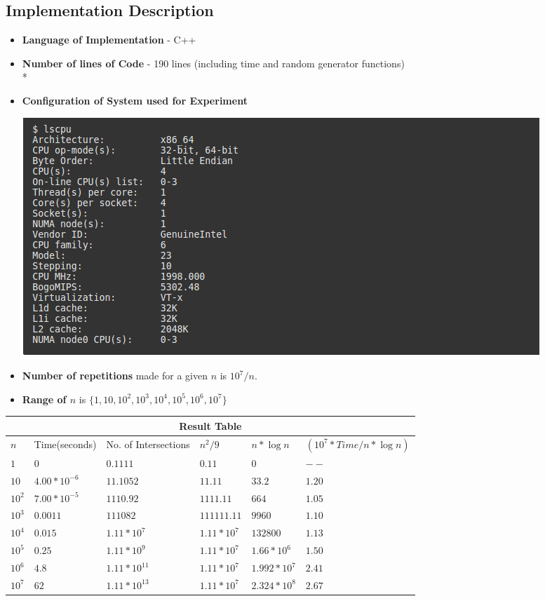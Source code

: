 \documentclass{article}
\begin{document}
\subsection{Implementation Description}
\begin{itemize}
\item {\bf Language of Implementation} - C++ 
\item {\bf Number of lines of Code} - 190 lines (including time and random generator functions)\\*
\item {\bf Configuration of System used for Experiment}
\begin{center}
\includegraphics[scale=0.5]{system_conf.png}
\end{center}
\item {\bf Number of repetitions} made for a given {\bf $n$} is {\bf $10^7/n$}. 
\item {\bf Range of $n$ } is {\bf $\{1,10,10^2, 10^3, 10^4, 10^5, 10^6, 10^7 \} $}
\end{itemize}
\hspace*{-2.5cm}\begin{tabular}{|p{1cm}|p{2.5cm}|p{2.5cm}|p{2cm}|p{2cm}|p{4cm}|}
 \hline
 \multicolumn{6}{|c|}{Result Table} \\
 \hline
 $n$   & Time(seconds) & No. of Intersections & $n^2/9$ &  $n *\log n $ & $(10^7 * Time/n* \log n)$\\
 \hline 
 $1$   	& $0$ 		& $0.1111$	& $ 0.11 $ 		& $ 0 $  		& $ -- $	\\
 \hline
 $10$  	& $4.00 * 10^{-6}$	& $11.1052$ & $ 11.11 $		& $ 33.2 $		& $ 1.20 $	\\
 \hline
 $10^2$	& $7.00 * 10^{-5}$	& $1110.92$	& $ 1111.11$		& $ 664 $		& $ 1.05 $	\\
 \hline
 $10^3$	& $0.0011$	& $111082$	& $ 111111.11 $ 	& $	9960	 $		& $ 1.10 $	\\
 \hline
 $10^4$	& $0.015$  	& $1.11* 10^7 $	& $ 1.11 * 10^7  $	& $	132800 $		& $ 1.13 $\\
 \hline
 $10^5$	& $0.25$ 	& $1.11* 10^9$& $ 1.11 * 10^7	$ 	& $	1.66 * 10^6$	& $ 1.50 $	\\
 \hline
 $10^6$	& $4.8$		& $1.11* 10^{11}$& $ 1.11 * 10^7 $	& $	1.992 * 10^7$	& $ 2.41 $	\\
 \hline
 $10^7$	& $62$		& $1.11* 10^{13}$& $ 1.11 * 10^7 $	& $	2.324 * 10^8$	& $ 2.67 $	\\
 \hline
\end{tabular}
\end{document}
